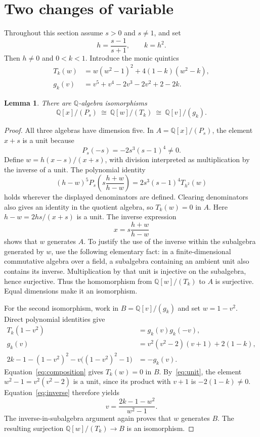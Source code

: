 \documentclass[11pt]{article}
\newcommand{\Q}{\mathbb Q}
\newtheorem{lemma}[theorem]{Lemma}
\begin{document}
\section{Two changes of variable}
Throughout this section assume $s>0$ and $s\ne1$, and set
\[
h=\frac{s-1}{s+1},\qquad k=h^2.
\]
Then $h\ne0$ and $0<k<1$. Introduce the monic quintics
\begin{align*}
T_k(w)&=w(w^2-1)^2+4(1-k)(w^2-k),\\
g_k(v)&=v^5+v^4-2v^3-2v^2+2-2k.
\end{align*}

\begin{lemma}\label{lem:algebras}
There are $\Q$-algebra isomorphisms
\[
\Q[x]/(P_s)\ \cong\ \Q[w]/(T_k)\ \cong\ \Q[v]/(g_k).
\]
\end{lemma}
\begin{proof}
All three algebras have dimension five. In $A=\Q[x]/(P_s)$, the element
$x+s$ is a unit because
\[
P_s(-s)=-2s^3(s-1)^4\ne0.
\]
Define $w=h(x-s)/(x+s)$, with division interpreted as multiplication by
the inverse of a unit. The polynomial identity
\begin{equation}\label{eq:mobius}
(h-w)^5P_s\!\left(s\frac{h+w}{h-w}\right)
=2s^3(s-1)^4T_{h^2}(w)
\end{equation}
holds wherever the displayed denominators are defined. Clearing denominators
also gives an identity in the quotient algebra, so $T_k(w)=0$ in $A$.
Here $h-w=2hs/(x+s)$ is a unit. The inverse expression
\[
x=s\frac{h+w}{h-w}
\]
shows that $w$ generates $A$. To justify the use of the inverse within the
subalgebra generated by $w$, use the following elementary fact: in a
finite-dimensional commutative algebra over a field, a subalgebra containing
an ambient unit also contains its inverse. Multiplication by that unit is
injective on the subalgebra, hence surjective. Thus the homomorphism from
$\Q[w]/(T_k)$ to $A$ is surjective. Equal dimensions make it an isomorphism.

For the second isomorphism, work in $B=\Q[v]/(g_k)$ and set $w=1-v^2$.
Direct polynomial identities give
\begin{align}
T_k(1-v^2)&=g_k(v)g_k(-v), \label{eq:composition}\\
g_k(v)&=v^2(v^2-2)(v+1)+2(1-k), \label{eq:unit}\\
2k-1-(1-v^2)^2-v\big((1-v^2)^2-1\big)&=-g_k(v). \label{eq:inverse}
\end{align}
Equation~\eqref{eq:composition} gives $T_k(w)=0$ in $B$.
By~\eqref{eq:unit}, the element
$w^2-1=v^2(v^2-2)$ is a unit, since its product with $v+1$ is
$-2(1-k)\ne0$. Equation~\eqref{eq:inverse} therefore yields
\[
v=\frac{2k-1-w^2}{w^2-1}.
\]
The inverse-in-subalgebra argument again proves that $w$ generates $B$.
The resulting surjection $\Q[w]/(T_k)\longrightarrow B$ is an isomorphism.
\end{proof}
\end{document}
